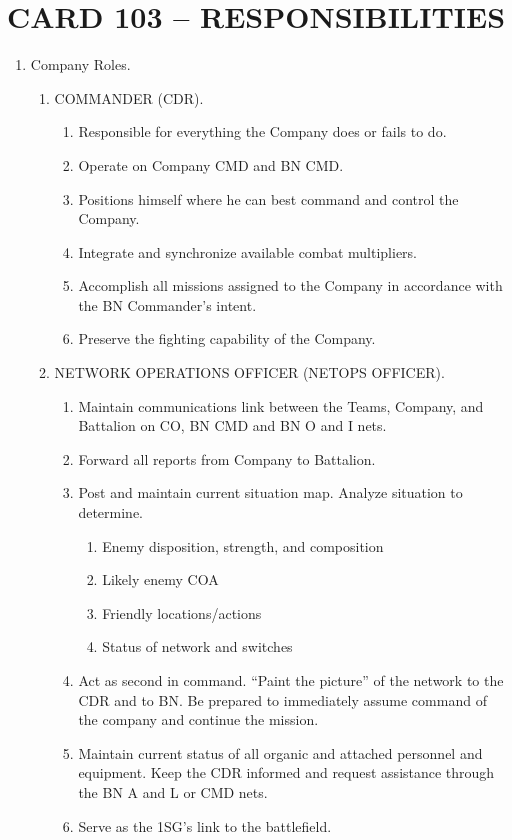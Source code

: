 \documentclass{article}
\begin{document}
\section*{CARD 103 – RESPONSIBILITIES}
\begin{enumerate}
\item Company Roles.
\begin{enumerate}
\item COMMANDER (CDR).
\begin{enumerate}
\item Responsible for everything the Company does or fails to do.
\item Operate on Company CMD and BN CMD.
\item Positions himself where he can best command and control the Company. 
\item Integrate and synchronize available combat multipliers.
\item Accomplish all missions assigned to the Company in accordance with the BN Commander’s intent.
\item Preserve the fighting capability of the Company.
\end{enumerate}
\item NETWORK OPERATIONS OFFICER (NETOPS OFFICER).
\begin{enumerate}
\item Maintain communications link between the Teams, Company, and Battalion on CO, BN CMD and BN O and I nets.
\item Forward all reports from Company to Battalion.
\item Post and maintain current situation map.  Analyze situation to determine.
\begin{enumerate}
\item Enemy disposition, strength, and composition
\item Likely enemy COA
\item Friendly locations/actions
\item Status of network and switches
\end{enumerate}
\item Act as second in command.  “Paint the picture” of the network to the CDR and to BN. Be prepared to immediately assume command of the company and continue the mission.  
\item Maintain current status of all organic and attached personnel and equipment.  Keep the CDR informed and request assistance through the BN A and L or CMD nets.  
\item Serve as the 1SG’s link to the battlefield.

\end{enumerate}
\end{enumerate}
\end{enumerate}
\end{document}
